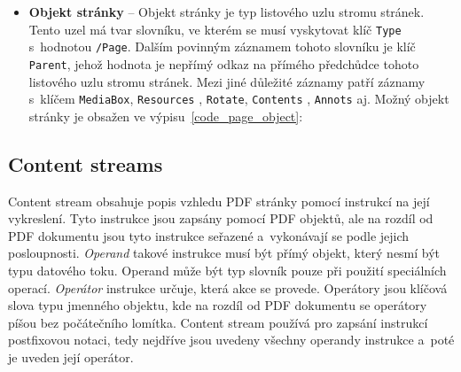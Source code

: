 \begin{itemize}
    \item \textbf{Objekt stránky} -- Objekt stránky je typ listového uzlu stromu
    stránek. Tento uzel má tvar slovníku, ve kterém se musí vyskytovat klíč
    \texttt{Type} s~hodnotou \texttt{/Page}. Dalším povinným záznamem tohoto
    slovníku je klíč \texttt{Parent}, jehož hodnota je nepřímý odkaz na přímého
    předchůdce tohoto listového uzlu stromu stránek. Mezi jiné důležité záznamy
    patří záznamy s~klíčem \texttt{MediaBox}, \texttt{Resources} , \texttt{Rotate},
    \texttt{Contents} , \texttt{Annots} aj.
    Možný objekt stránky je obsažen ve výpisu~\ref{code_page_object}:
\end{itemize}


\subsection*{Content streams} \label{content_streams}
Content stream obsahuje popis vzhledu PDF stránky pomocí instrukcí na její
vykreslení. Tyto instrukce jsou zapsány pomocí PDF objektů, ale na rozdíl od
PDF dokumentu jsou tyto instrukce seřazené a~vykonávají se podle jejich
posloupnosti. \emph{Operand} takové instrukce musí být přímý objekt, který 
nesmí být typu datového toku. Operand může být typ slovník pouze při použití
speciálních operací. \emph{Operátor} instrukce určuje, která akce se provede.
Operátory jsou klíčová slova typu jmenného objektu, kde na rozdíl od PDF dokumentu
se operátory píšou bez počátečního lomítka. Content stream používá pro zapsání
instrukcí postfixovou notaci, tedy nejdříve jsou uvedeny všechny operandy instrukce
a~poté je uveden její operátor.


